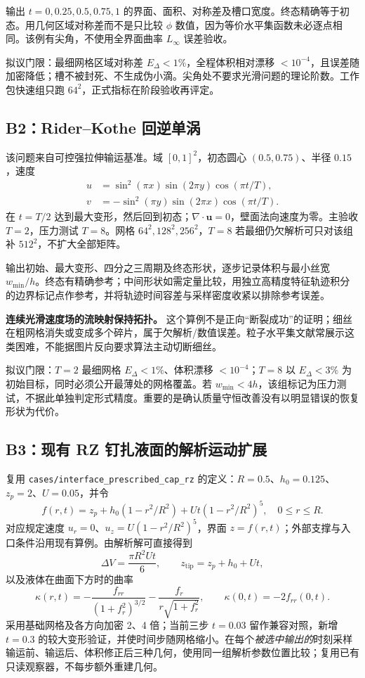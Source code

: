 \documentclass[11pt,a4paper]{article}
\newcommand{\vct}[1]{\boldsymbol{#1}}
\newcommand{\code}[1]{{\small\nolinkurl{#1}}}
\begin{document}
输出 $t=0,0.25,0.5,0.75,1$ 的界面、面积、对称差及槽口宽度。终态精确等于初态。用几何区域对称差而不是只比较 $\phi$ 数值，因为等价水平集函数未必逐点相同。该例有尖角，不使用全界面曲率 $L_\infty$ 误差验收。

拟议门限：最细网格区域对称差 $E_\Delta<1\%$，全程体积相对漂移 $<10^{-4}$，且误差随加密降低；槽不被封死、不生成伪小滴。尖角处不要求光滑问题的理论阶数。工作包快速组只跑 $64^2$，正式指标在阶段验收再评定。

\subsection{B2：Rider--Kothe 回逆单涡}
该问题来自可控强拉伸输运基准\cite{rider1998,enright2002}。域 $[0,1]^2$，初态圆心 $(0.5,0.75)$、半径 $0.15$，速度
\begin{align}
u&=\sin^2(\pi x)\sin(2\pi y)\cos(\pi t/T),\\
v&=-\sin^2(\pi y)\sin(2\pi x)\cos(\pi t/T).
\end{align}
在 $t=T/2$ 达到最大变形，然后回到初态；$\nabla\cdot\vct u=0$，壁面法向速度为零。主验收 $T=2$，压力测试 $T=8$。网格 $64^2,128^2,256^2$，$T=8$ 若最细仍欠解析可只对该组补 $512^2$，不扩大全部矩阵。

输出初始、最大变形、四分之三周期及终态形状，逐步记录体积与最小丝宽 $w_{\min}/h$。终态有精确参考；中间形状如需定量比较，用独立高精度特征轨迹积分的边界标记点作参考，并将轨迹时间容差与采样密度收紧以排除参考误差。

\textbf{连续光滑速度场的流映射保持拓扑。} 这个算例不是正向“断裂成功”的证明；细丝在粗网格消失或变成多个碎片，属于欠解析/数值误差。粒子水平集文献常展示这类困难，不能据图片反向要求算法主动切断细丝。

拟议门限：$T=2$ 最细网格 $E_\Delta<1\%$、体积漂移 $<10^{-4}$；$T=8$ 以 $E_\Delta<3\%$ 为初始目标，同时必须公开最薄处的网格覆盖。若 $w_{\min}<4h$，该组标记为压力测试，不据此单独判定形式精度。重要的是确认质量守恒改善没有以明显错误的恢复形状为代价。

\subsection{B3：现有 RZ 钉扎液面的解析运动扩展}
复用 \code{cases/interface_prescribed_cap_rz} 的定义：$R=0.5$、$h_0=0.125$、$z_p=2$、$U=0.05$，并令
\begin{equation}
f(r,t)=z_p+h_0(1-r^2/R^2)+Ut(1-r^2/R^2)^5,\quad 0\leq r\leq R.
\end{equation}
对应规定速度 $u_r=0$、$u_z=U(1-r^2/R^2)^5$，界面 $z=f(r,t)$；外部支撑与入口条件沿用现有算例。由解析解可直接得到
\begin{equation}
\Delta V=\frac{\pi R^2Ut}{6},\qquad z_{\mathrm{tip}}=z_p+h_0+Ut,
\end{equation}
以及液体在曲面下方时的曲率
\begin{equation}\label{eq:capcurv}
\kappa(r,t)=-\frac{f_{rr}}{(1+f_r^2)^{3/2}}-\frac{f_r}{r\sqrt{1+f_r^2}},\qquad
\kappa(0,t)=-2f_{rr}(0,t).
\end{equation}
采用基础网格及各方向加密 2、4 倍；当前三步 $t=0.03$ 留作兼容对照，新增 $t=0.3$ 的较大变形验证，并使时间步随网格缩小。在每个\emph{被选中输出的}时刻采样输运前、输运后、体积修正后三种几何，使用同一组解析参数位置比较；复用已有只读观察器，不每步额外重建几何。
\end{document}

